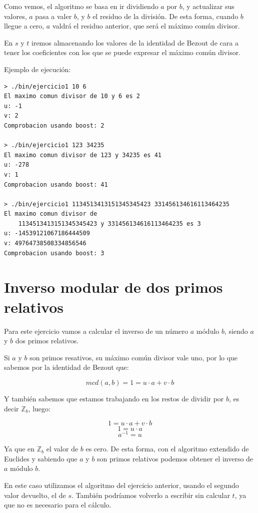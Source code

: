 \documentclass[12pt, spanish]{article}
\begin{document}
Como vemos, el algoritmo se basa en ir dividiendo $a$ por $b$, y actualizar sus valores, $a$ pasa a valer $b$, y $b$ el residuo de la división. De esta forma, cuando $b$ llegue a cero, $a$ valdrá el residuo anterior, que será el máximo común divisor.

En $s$ y $t$ iremos almacenando los valores de la identidad de Bezout de cara a tener los coeficientes con los que se puede expresar el máximo común divisor.

Ejemplo de ejecución:

\begin{lstlisting}
> ./bin/ejercicio1 10 6
El maximo comun divisor de 10 y 6 es 2
u: -1
v: 2
Comprobacion usando boost: 2

> ./bin/ejercicio1 123 34235
El maximo comun divisor de 123 y 34235 es 41
u: -278
v: 1
Comprobacion usando boost: 41

> ./bin/ejercicio1 1134513413151345345423 331456134616113464235
El maximo comun divisor de
	1134513413151345345423 y 331456134616113464235 es 3
u: -14539121067186444509
v: 49764738508334856546
Comprobacion usando boost: 3
\end{lstlisting}


\section{Inverso modular de dos primos relativos}

Para este ejercicio vamos a calcular el inverso de un número $a$ módulo $b$, siendo $a$ y $b$ dos primos relativos.

Si $a$ y $b$ son primos resativos, su máximo común divisor vale uno, por lo que sabemos por la identidad de Bezout que:

$$ mcd(a, b) = 1 = u \cdot a + v \cdot b $$

Y también sabemos que estamos trabajando en los restos de dividir por $b$, es decir $\mathbb{Z}_b$, luego:

$$1 = u \cdot a + v \cdot b $$
$$1 = u \cdot a $$
$$a^{-1} = u$$

Ya que en $\mathbb{Z}_b$ el valor de $b$ es cero. De esta forma, con el algoritmo extendido de Euclides y sabiendo que $a$ y $b$ son primos relativos podemos obtener el inverso de $a$ módulo $b$.

En este caso utilizamos el algoritmo del ejercicio anterior, usando el segundo valor devuelto, el de $s$. También podríamos volverlo a escribir sin calcular $t$, ya que no es necesario para el cálculo.
\end{document}
